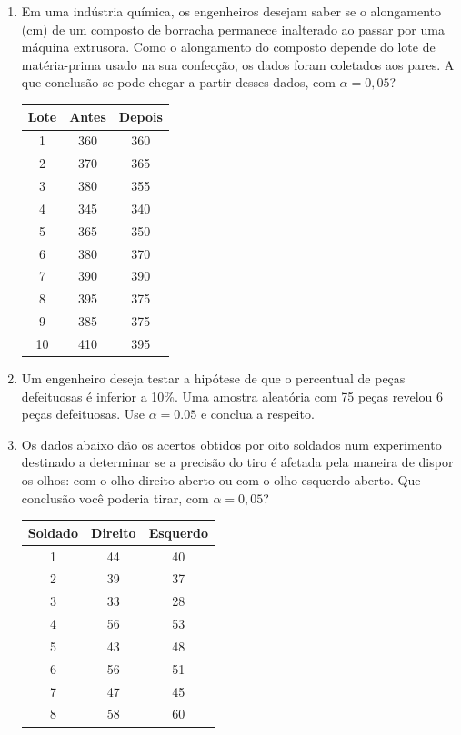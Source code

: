 \documentclass[12pt, a4paper]{article}
\begin{document}
\begin{enumerate}
\item Em uma indústria química, os engenheiros desejam saber se o alongamento (cm) de um composto de borracha permanece inalterado ao passar por uma máquina extrusora. Como o alongamento do composto depende do lote de matéria-prima usado na sua confecção, os dados foram coletados aos pares. A que conclusão se pode chegar a partir desses dados, com $\alpha=0,05$?
\begin{center}
\begin{tabular}{|c|c|c|}
\hline
\textbf{Lote} & \textbf{Antes} & \textbf{Depois} \\
\hline
1 & 360 & 360 \\
2 & 370 & 365 \\
3 & 380 & 355 \\
4 & 345 & 340 \\
5 & 365 & 350 \\
6 & 380 & 370 \\
7 & 390 & 390 \\
8 & 395 & 375 \\
9 & 385 & 375 \\
10 & 410 & 395 \\
\hline
\end{tabular}
\end{center}

\item Um engenheiro deseja testar a hipótese de que o percentual de peças defeituosas é inferior a 10\%. Uma amostra aleatória com 75 peças revelou 6 peças defeituosas. Use $\alpha=0.05$ e conclua a respeito.

\item Os dados abaixo dão os acertos obtidos por oito soldados num experimento destinado a determinar se a precisão do tiro é afetada pela maneira de dispor os olhos: com o olho direito aberto ou com o olho esquerdo aberto. Que conclusão você poderia tirar, com $\alpha=0,05$?
\begin{center}
\begin{tabular}{|c|c|c|}
\hline
\textbf{Soldado} & \textbf{Direito} & \textbf{Esquerdo} \\
\hline
1 & 44 & 40 \\
2 & 39 & 37 \\
3 & 33 & 28 \\
4 & 56 & 53 \\
5 & 43 & 48 \\
6 & 56 & 51 \\
7 & 47 & 45 \\
8 & 58 & 60 \\
\hline
\end{tabular}
\end{center}


\end{enumerate}
\end{document}
